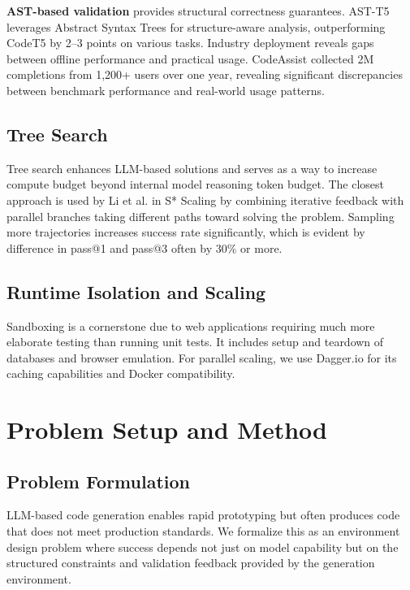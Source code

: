\documentclass[11pt]{article}
\begin{document}
\textbf{AST-based validation} provides structural correctness guarantees. AST-T5 leverages Abstract Syntax Trees for structure-aware analysis, outperforming CodeT5 by 2--3 points on various tasks. Industry deployment reveals gaps between offline performance and practical usage. CodeAssist collected 2M completions from 1,200+ users over one year, revealing significant discrepancies between benchmark performance and real-world usage patterns.

\subsection{Tree Search}

Tree search enhances LLM-based solutions and serves as a way to increase compute budget beyond internal model reasoning token budget. The closest approach is used by Li et al. in S* Scaling \citep{li2025s} by combining iterative feedback with parallel branches taking different paths toward solving the problem. Sampling more trajectories increases success rate significantly, which is evident by difference in pass@1 and pass@3 often by 30\% or more.

\subsection{Runtime Isolation and Scaling}
Sandboxing is a cornerstone due to web applications requiring much more elaborate testing than running unit tests. It includes setup and teardown of databases and browser emulation. For parallel scaling, we use Dagger.io for its caching capabilities and Docker compatibility.

\section{Problem Setup and Method}
\label{sec:method}

\subsection{Problem Formulation}

LLM-based code generation enables rapid prototyping but often produces code that does not meet production standards. We formalize this as an environment design problem where success depends not just on model capability but on the structured constraints and validation feedback provided by the generation environment.
\end{document}
